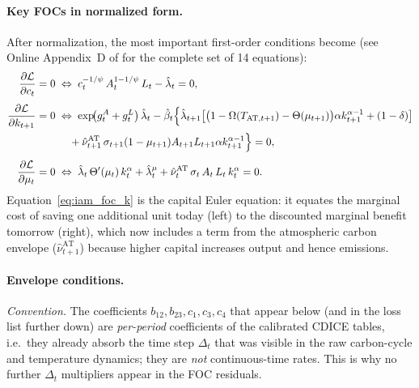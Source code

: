 \documentclass[11pt,a4paper]{report}
\begin{document}
\paragraph{Key FOCs in normalized form.}
After normalization, the most important first-order conditions become (see Online Appendix~D of \citet{Folini_2021} for the complete set of 14 equations):
\begin{align}
\frac{\partial \mathcal{L}}{\partial c_t} = 0 \;&\Leftrightarrow\;
c_t^{-1/\psi}\,A_t^{1-1/\psi}\,L_t - \hat{\lambda}_t = 0,
\label{eq:iam_foc_c}\\[4pt]
\frac{\partial \mathcal{L}}{\partial k_{t+1}} = 0 \;&\Leftrightarrow\;
\exp\!\bigl(g^A_t + g^L_t\bigr)\,\hat{\lambda}_t - \hat{\beta}_t\Bigl\{\hat{\lambda}_{t+1}\bigl[\bigl(1-\Omega(T_{\mathrm{AT},t+1}) - \Theta(\mu_{t+1})\bigr)\alpha k_{t+1}^{\alpha-1} + (1-\delta)\bigr] \nonumber\\
&\quad + \hat{\nu}^{\mathrm{AT}}_{t+1}\,\sigma_{t+1}(1-\mu_{t+1})A_{t+1}L_{t+1}\alpha k_{t+1}^{\alpha-1}\Bigr\} = 0,
\label{eq:iam_foc_k}\\[4pt]
\frac{\partial \mathcal{L}}{\partial \mu_t} = 0 \;&\Leftrightarrow\;
\hat{\lambda}_t\,\Theta'(\mu_t)\,k_t^\alpha + \hat{\lambda}^\mu_t + \hat{\nu}^{\mathrm{AT}}_t\,\sigma_t\,A_t\,L_t\,k_t^\alpha = 0.
\label{eq:iam_foc_mu}
\end{align}
Equation~\eqref{eq:iam_foc_k} is the capital Euler equation: it equates the marginal cost of saving one additional unit today (left) to the discounted marginal benefit tomorrow (right), which now includes a term from the atmospheric carbon envelope ($\hat{\nu}^{\mathrm{AT}}_{t+1}$) because higher capital increases output and hence emissions.

\paragraph{Envelope conditions.}
\textit{Convention.} The coefficients $b_{12}, b_{23}, c_1, c_3, c_4$ that appear below (and in the loss list further down) are \emph{per-period} coefficients of the calibrated CDICE tables, i.e.\ they already absorb the time step $\Delta_t$ that was visible in the raw carbon-cycle and temperature dynamics; they are \emph{not} continuous-time rates.  This is why no further $\Delta_t$ multipliers appear in the FOC residuals.
\end{document}
